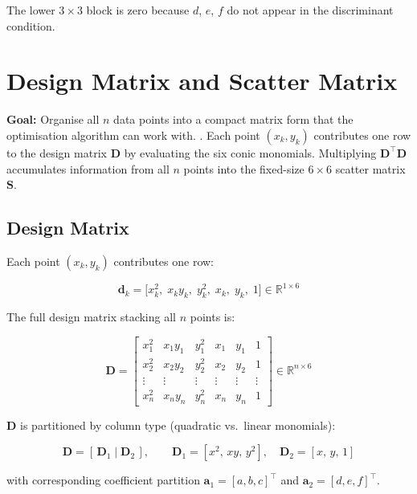 \documentclass{article}
\begin{document}
	The lower $3\times3$ block is zero because $d$, $e$, $f$
	do not appear in the discriminant condition.
	
	
	\section{Design Matrix and Scatter Matrix}
	
	
	\textbf{Goal:} Organise all $n$ data points into a compact
	matrix form that the optimisation algorithm can work with.
	. Each point $(x_k, y_k)$ contributes one row
	to the design matrix $\mathbf{D}$ by evaluating the six
	conic monomials.
	Multiplying $\mathbf{D}^\top\mathbf{D}$ accumulates
	information from all $n$ points into the fixed-size
	$6\times6$ scatter matrix $\mathbf{S}$.
	
	\subsection{Design Matrix}
	
	Each point $(x_k, y_k)$ contributes one row:
	
	\begin{equation}
		\mathbf{d}_k = \bigl[x_k^2,\; x_k y_k,\; y_k^2,\;
		x_k,\; y_k,\; 1\bigr]
		\in \mathbb{R}^{1 \times 6}
	\end{equation}
	
	The full design matrix stacking all $n$ points is:
	
	\begin{equation}
		\mathbf{D} =
		\begin{bmatrix}
			x_1^2 & x_1 y_1 & y_1^2 & x_1 & y_1 & 1 \\
			x_2^2 & x_2 y_2 & y_2^2 & x_2 & y_2 & 1 \\
			\vdots & \vdots & \vdots & \vdots & \vdots & \vdots \\
			x_n^2 & x_n y_n & y_n^2 & x_n & y_n & 1
		\end{bmatrix}
		\in \mathbb{R}^{n \times 6}
	\end{equation}
	
	$\mathbf{D}$ is partitioned by column type
	(quadratic vs.\ linear monomials):
	
	\begin{equation}
		\mathbf{D} = [\,\mathbf{D}_1\; |\; \mathbf{D}_2\,],
		\qquad
		\mathbf{D}_1 = [x^2,\, xy,\, y^2],\quad
		\mathbf{D}_2 = [x,\, y,\, 1]
	\end{equation}
	
	with corresponding coefficient partition
	$\mathbf{a}_1 = [a,b,c]^\top$ and $\mathbf{a}_2 = [d,e,f]^\top$.
	
\end{document}
